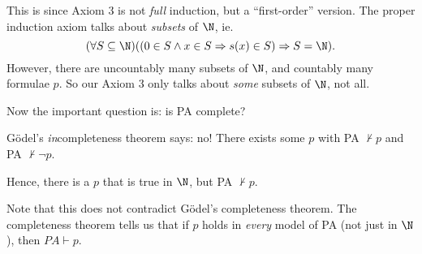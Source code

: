 \documentclass[a4paper]{article}
\begin{document}
This is since Axiom 3 is not \emph{full} induction, but a ``first-order'' version. The proper induction axiom talks about \emph{subsets} of $\N$, ie.
\[
  (\forall S\subseteq \N )((0 \in S \wedge x\in S \Rightarrow s(x)\in S)\Rightarrow S=\N).
\]
However, there are uncountably many subsets of $\N$, and countably many formulae $p$. So our Axiom 3 only talks about \emph{some} subsets of $\N$, not all.

Now the important question is: is PA complete?

G\"odel's \emph{in}completeness theorem says: no! There exists some $p$ with PA $\not\vdash p$ and PA $\not\vdash \neg p$.

Hence, there is a $p$ that is true in $\N$, but PA $\not\vdash p$.

Note that this does not contradict G\"odel's completeness theorem. The completeness theorem tells us that if $p$ holds in \emph{every} model of PA (not just in $\N$), then $PA\vdash p$.
\end{document}
